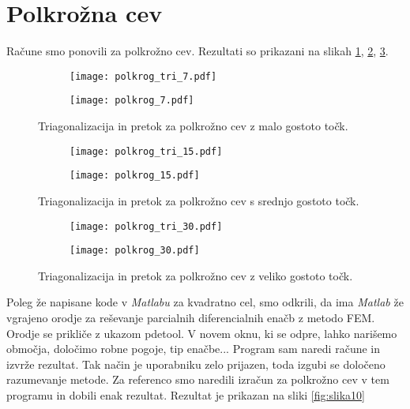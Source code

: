 \documentclass[12pt,a4paper]{article}
\begin{document}
\section*{Polkrožna cev}

Račune smo ponovili za polkrožno cev. Rezultati so prikazani na slikah \ref{fig:slika7}, \ref{fig:slika8}, \ref{fig:slika9}.

\begin{figure}[H]
    \centering
    \begin{subfigure}[b]{0.45\textwidth}  			
        \texttt{[image: polkrog\_tri\_7.pdf]}
    \end{subfigure}
    \begin{subfigure}[b]{0.45\textwidth}
        \texttt{[image: polkrog\_7.pdf]}
    \end{subfigure}
    \caption{Triagonalizacija in pretok za polkrožno cev z malo gostoto točk.} \label{fig:slika7}
\end{figure}

\begin{figure}[H]
    \centering
    \begin{subfigure}[b]{0.45\textwidth}  			
        \texttt{[image: polkrog\_tri\_15.pdf]}
    \end{subfigure}
    \begin{subfigure}[b]{0.45\textwidth}
        \texttt{[image: polkrog\_15.pdf]}
    \end{subfigure}
    \caption{Triagonalizacija in pretok za polkrožno cev s srednjo gostoto točk.} \label{fig:slika8}
\end{figure}

\begin{figure}[H]
    \centering
    \begin{subfigure}[b]{0.45\textwidth}  			
        \texttt{[image: polkrog\_tri\_30.pdf]}
    \end{subfigure}
    \begin{subfigure}[b]{0.45\textwidth}
        \texttt{[image: polkrog\_30.pdf]}
    \end{subfigure}
    \caption{Triagonalizacija in pretok za polkrožno cev z veliko gostoto točk.} \label{fig:slika9}
\end{figure}

Poleg že napisane kode v \textit{Matlabu} za kvadratno cel, smo odkrili, da ima \textit{Matlab} že vgrajeno orodje za reševanje parcialnih diferencialnih enačb z metodo FEM. Orodje se prikliče z ukazom \textsf{pdetool}. V novem oknu, ki se odpre, lahko narišemo območja, določimo robne pogoje, tip enačbe... Program sam naredi račune in izvrže rezultat. Tak način je uporabniku zelo prijazen, toda izgubi se določeno razumevanje metode. Za referenco smo naredili izračun za polkrožno cev v tem programu in dobili enak rezultat. Rezultat je prikazan na sliki \ref{fig:slika10}
\end{document}
